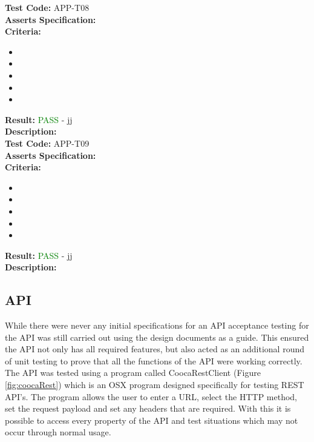 \documentclass[11pt,a4paper]{report}
\begin{document}
\label{test:APP-T08}
\noindent\textbf{Test Code:} APP-T08\\
\textbf{Asserts Specification:} \\ 
\textbf{Criteria:} \begin{itemize}
                     \item  
                     \item 
                     \item
                     \item
                     \item 
                   \end{itemize}
\textbf{Result:} \textcolor{green}{PASS} - jj\\
\textbf{Description:} \\

\label{test:APP-T09}
\noindent\textbf{Test Code:} APP-T09\\
\textbf{Asserts Specification:} \\ 
\textbf{Criteria:} \begin{itemize}
                     \item  
                     \item 
                     \item
                     \item
                     \item 
                   \end{itemize}
\textbf{Result:} \textcolor{green}{PASS} - jj\\
\textbf{Description:} \\

\subsection{API}

While there were never any initial specifications for an API acceptance testing for the API was still carried out using the design documents as a guide. This ensured the API not only has all required features, but also acted as an additional round of unit testing to prove that all the functions of the API were working correctly. The API was tested using a program called CoocaRestClient (Figure \ref{fig:coocaRest}) which is an OSX program designed specifically for testing REST API's. The program allows the user to enter a URL, select the HTTP method, set the request payload and set any headers that are required. With this it is possible to access every property of the API and test situations which may not occur through normal usage. \\
\end{document}
